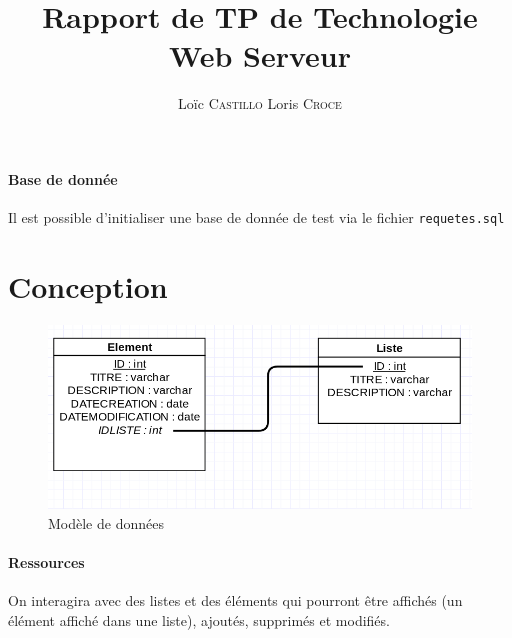 \documentclass[12pt, a4paper]{article}
\date{}
\title{Rapport de TP de Technologie Web Serveur}
\author{Loïc \textsc{Castillo} Loris \textsc{Croce}}
\begin{document}
\maketitle

\paragraph{Base de donnée} Il est possible d'initialiser une base de donnée de test via le fichier \verb|requetes.sql|

\section{Conception}

\begin{figure}[!h]
   \includegraphics[width=15cm]{donnees.png}
   \caption{Modèle de données}
\end{figure}

\paragraph{Ressources} On interagira avec des listes et des éléments qui pourront être affichés (un élément affiché dans une liste), ajoutés, supprimés et modifiés.
\end{document}
